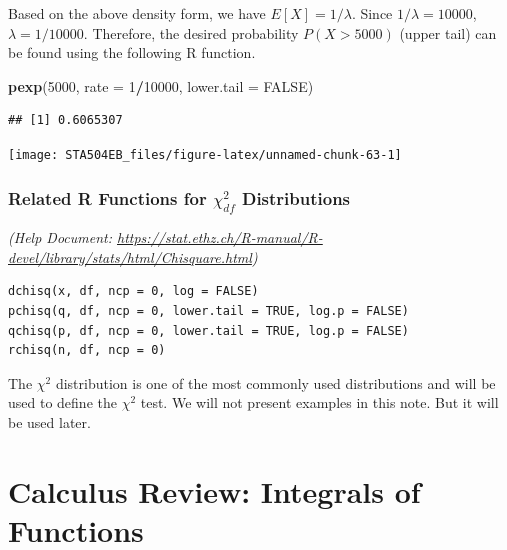 \documentclass[
]{book}
\newenvironment{Shaded}{\begin{snugshade}}{\end{snugshade}}
\newcommand{\AttributeTok}[1]{\textcolor[rgb]{0.13,0.29,0.53}{#1}}
\newcommand{\ConstantTok}[1]{\textcolor[rgb]{0.56,0.35,0.01}{#1}}
\newcommand{\DecValTok}[1]{\textcolor[rgb]{0.00,0.00,0.81}{#1}}
\newcommand{\FunctionTok}[1]{\textcolor[rgb]{0.13,0.29,0.53}{\textbf{#1}}}
\newcommand{\NormalTok}[1]{#1}
\newcommand{\SpecialCharTok}[1]{\textcolor[rgb]{0.81,0.36,0.00}{\textbf{#1}}}
\begin{document}
Based on the above density form, we have \(E[X] = 1/\lambda\). Since \(1/\lambda = 10000\), \(\lambda = 1/10000\). Therefore, the desired probability \(P(X > 5000)\) (upper tail) can be found using the following R function.

\begin{Shaded}
\begin{Highlighting}[]
\FunctionTok{pexp}\NormalTok{(}\DecValTok{5000}\NormalTok{, }\AttributeTok{rate =} \DecValTok{1}\SpecialCharTok{/}\DecValTok{10000}\NormalTok{,  }\AttributeTok{lower.tail =} \ConstantTok{FALSE}\NormalTok{)}
\end{Highlighting}
\end{Shaded}

\begin{verbatim}
## [1] 0.6065307
\end{verbatim}

\begin{center}\texttt{[image: STA504EB\_files/figure-latex/unnamed-chunk-63-1]} \end{center}

\hfill\break

\hypertarget{related-r-functions-for-chi_df2-distributions}{%
\subsubsection{\texorpdfstring{Related R Functions for \(\chi_{df}^2\) Distributions}{Related R Functions for \textbackslash chi\_\{df\}\^{}2 Distributions}}\label{related-r-functions-for-chi_df2-distributions}}

\emph{(Help Document: \url{https://stat.ethz.ch/R-manual/R-devel/library/stats/html/Chisquare.html})}

\begin{verbatim}
dchisq(x, df, ncp = 0, log = FALSE)
pchisq(q, df, ncp = 0, lower.tail = TRUE, log.p = FALSE)
qchisq(p, df, ncp = 0, lower.tail = TRUE, log.p = FALSE)
rchisq(n, df, ncp = 0)
\end{verbatim}

The \(\chi^2\) distribution is one of the most commonly used distributions and will be used to define the \(\chi^2\) test. We will not present examples in this note. But it will be used later.

\hfill\break

\hypertarget{calculus-review-integrals-of-functions-1}{%
\section{Calculus Review: Integrals of Functions}\label{calculus-review-integrals-of-functions-1}}
\end{document}

